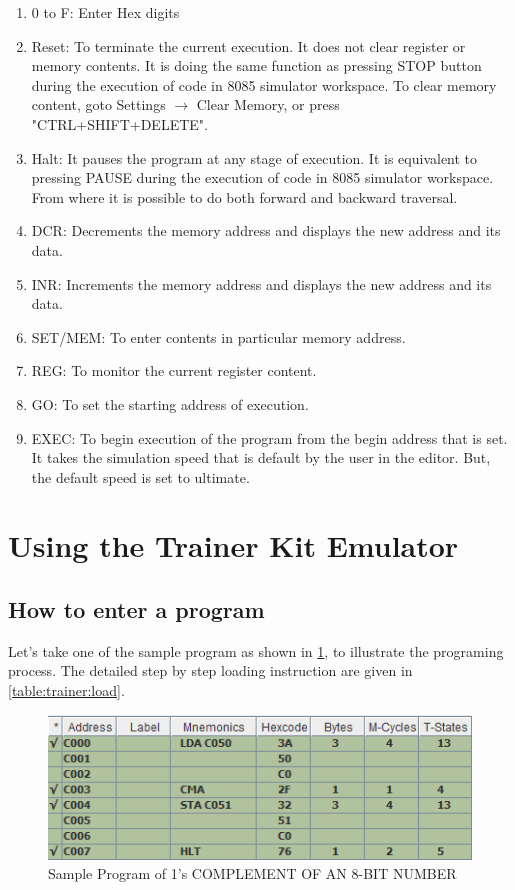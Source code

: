 \begin{enumerate}
\item 0 to F: Enter Hex digits
\item Reset: To terminate the current execution. It does not clear register or memory contents. It is doing the same function as pressing STOP button during the execution of code in 8085 simulator workspace. To clear memory content, goto Settings $ \rightarrow $ Clear Memory, or press "CTRL+SHIFT+DELETE".  
\item Halt: It pauses the program at any stage of execution. It is equivalent to pressing PAUSE during the execution of code in 8085 simulator workspace. From where it is possible to do both forward and backward traversal.
\item DCR: Decrements the memory address and displays the new address and its data.
\item INR: Increments the memory address and displays the new address and its data.
\item SET/MEM: To enter contents in particular memory address.
\item REG: To monitor the current register content.
\item GO: To set the starting address of execution.
\item EXEC: To begin execution of the program from the begin address that is set. It takes the simulation speed that is default by the user in the editor. But, the default speed is set to ultimate. 
\end{enumerate}

\section{Using the Trainer Kit Emulator}

\subsection{How to enter a program}
Let's take one of the sample program as shown in \cref{fig:samplecode2}, to illustrate the programing process. The detailed step by step loading instruction are given in \cref{table:trainer:load}.
\begin{figure}[htbp]
\centering
\includegraphics[width=0.75\linewidth]{sampleCode2Asm}
\caption{Sample Program of 1's COMPLEMENT OF AN 8-BIT NUMBER}
\label{fig:samplecode2}
\end{figure}

